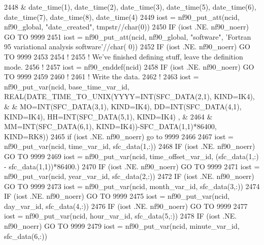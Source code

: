 \begin{DoxyCode}
{{{{{{2448         & date\_time(1), date\_time(2), date\_time(3), date\_time(5), date\_time(6), date\_time(7), date\_time(8),
       date\_time(4)
2449     iost    = nf90\_put\_att(ncid, nf90\_global, \textcolor{stringliteral}{"date\_created"}, tmpstr//char(0))
2450     \textcolor{keywordflow}{IF} (iost .NE. nf90\_noerr) \textcolor{keywordflow}{GO TO} 9999
2451     iost    = nf90\_put\_att(ncid, nf90\_global, \textcolor{stringliteral}{"software"}, \textcolor{stringliteral}{'Fortran 95 variational analysis software'}//char(
      0))
2452     \textcolor{keywordflow}{IF} (iost .NE. nf90\_noerr) \textcolor{keywordflow}{GO TO} 9999
2453 
2454     \textcolor{comment}{!}
2455     \textcolor{comment}{! We've finished defining stuff, leave the definition mode.}
2456     \textcolor{comment}{!}
2457     iost    = nf90\_enddef(ncid)
2458     \textcolor{keywordflow}{IF} (iost .NE. nf90\_noerr) \textcolor{keywordflow}{GO TO} 9999
2459 
2460     \textcolor{comment}{!}
2461     \textcolor{comment}{! Write the data.}
2462     \textcolor{comment}{!}
2463     iost    = nf90\_put\_var(ncid, base\_time\_var\_id, \textcolor{keywordtype}{REAL(DATE\_TIME\_TO\_UNIX(YYYY=INT(SFC\_DATA(2,1),
       KIND=IK4), &
        & MO=INT(SFC\_DATA(3,1), KIND=IK4), DD=INT(SFC\_DATA(4,1), KIND=IK4), HH=INT(SFC\_DATA(5,1), KIND=IK4)}
      , &
2464         & MM=INT(SFC\_DATA(6,1), KIND=IK4))-SFC\_DATA(1,1)*86400, KIND=RK8))
2465     if (iost .NE. nf90\_noerr) go to 9999
2466 
2467     iost    = nf90\_put\_var(ncid,    time\_var\_id,        sfc\_data(1,:))
2468     \textcolor{keywordflow}{IF} (iost .NE. nf90\_noerr) \textcolor{keywordflow}{GO TO} 9999
2469     iost    = nf90\_put\_var(ncid,    time\_offset\_var\_id, (sfc\_data(1,:) - sfc\_data(1,1))*86400.)
2470     \textcolor{keywordflow}{IF} (iost .NE. nf90\_noerr) \textcolor{keywordflow}{GO TO} 9999
2471     iost    = nf90\_put\_var(ncid,    year\_var\_id,        sfc\_data(2,:))
2472     \textcolor{keywordflow}{IF} (iost .NE. nf90\_noerr) \textcolor{keywordflow}{GO TO} 9999
2473     iost    = nf90\_put\_var(ncid,    month\_var\_id,       sfc\_data(3,:))
2474     \textcolor{keywordflow}{IF} (iost .NE. nf90\_noerr) \textcolor{keywordflow}{GO TO} 9999
2475     iost    = nf90\_put\_var(ncid,    day\_var\_id,         sfc\_data(4,:))
2476     \textcolor{keywordflow}{IF} (iost .NE. nf90\_noerr) \textcolor{keywordflow}{GO TO} 9999
2477     iost    = nf90\_put\_var(ncid,    hour\_var\_id,        sfc\_data(5,:))
2478     \textcolor{keywordflow}{IF} (iost .NE. nf90\_noerr) \textcolor{keywordflow}{GO TO} 9999
2479     iost    = nf90\_put\_var(ncid,    minute\_var\_id,      sfc\_data(6,:))
}}}}}}
\end{DoxyCode}
